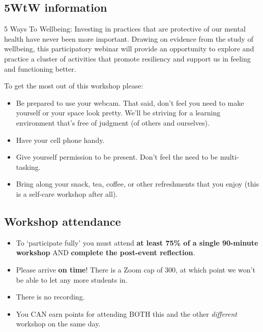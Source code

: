 \documentclass[
  openany]{book}
\providecommand{\tightlist}{%
  \setlength{\itemsep}{0pt}\setlength{\parskip}{0pt}}
\begin{document}
\hypertarget{wtw-information}{%
\subsection{5WtW information}\label{wtw-information}}

5 Ways To Wellbeing: Investing in practices that are protective of our mental health have never been more important. Drawing on evidence from the study of wellbeing, this participatory webinar will provide an opportunity to explore and practice a cluster of activities that promote resiliency and support us in feeling and functioning better.

To get the most out of this workshop please:

\begin{itemize}
\tightlist
\item
  Be prepared to use your webcam. That said, don't feel you need to make yourself or your space look pretty. We'll be striving for a learning environment that's free of judgment (of others and ourselves).\\
\item
  Have your cell phone handy.
\item
  Give yourself permission to be present. Don't feel the need to be multi-tasking.
\item
  Bring along your snack, tea, coffee, or other refreshments that you enjoy (this is a self-care workshop after all).
\end{itemize}

\hypertarget{workshop-attendance-2}{%
\subsection{Workshop attendance}\label{workshop-attendance-2}}

\begin{itemize}
\item
  To `participate fully' you must attend \textbf{at least 75\% of a single 90-minute workshop} AND \textbf{complete the post-event reflection}.
\item
  Please arrive \textbf{on time}! There is a Zoom cap of 300, at which point we won't be able to let any more students in.
\item
  There is no recording.
\item
  You CAN earn points for attending BOTH this and the other \emph{different} workshop on the same day.
\end{itemize}
\end{document}

